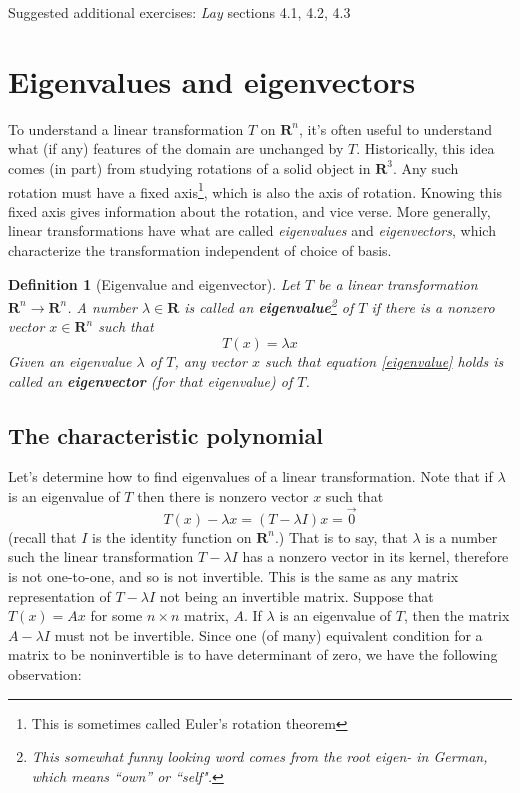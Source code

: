 \documentclass[12pt]{article}
\numberwithin{equation}{subsection}
\numberwithin{figure}{subsection}
\newtheorem{defn}[subsection]{Definition}
\theoremstyle{note}
\newcommand{\R}{\mathbf{R}}
\begin{document}
Suggested additional exercises: \textit{Lay} sections 4.1, 4.2, 4.3



\section{Eigenvalues and eigenvectors}

To understand a linear transformation $T$ on $\mathbf{R}^n$, it's often useful to understand what (if any) features of the domain are unchanged by $T$. Historically, this idea comes (in part) from studying rotations of a solid object in $\R^3$. Any such rotation must have a fixed axis\footnote{This is sometimes called Euler's rotation theorem}, which is also the axis of rotation. Knowing this fixed axis gives information about the rotation, and vice verse. More generally, linear transformations have what are called \textit{eigenvalues} and \textit{eigenvectors}, which characterize the transformation independent of choice of basis.   %


\begin{defn}[Eigenvalue and eigenvector]Let $T$ be a linear transformation $\mathbf{R}^n\to\mathbf{R}^n$. A number $\lambda\in\mathbf{R}$ is called an \textbf{eigenvalue}\footnote{This somewhat funny looking word comes from the root \textit{eigen}- in German, which means ``own'' or ``self".} of $T$ if there is a nonzero vector $x\in\mathbf{R}^n$ such that \begin{equation} \label{eigenvalue} T(x)=\lambda x\end{equation}
Given an eigenvalue $\lambda$ of $T$, any vector $x$ such that equation \eqref{eigenvalue} holds is called an \textbf{eigenvector} (for that {eigenvalue}) of $T$. 
\end{defn}


\subsection{The characteristic polynomial} 
Let's determine how to find eigenvalues of a linear transformation. Note that if $\lambda$ is an eigenvalue of $T$ then there is nonzero vector $x$ such that 
\begin{equation} T(x)-\lambda x=(T-\lambda I)x=\vec{0} \end{equation}
(recall that $I$ is the identity function on $\mathbf{R}^n$.) That is to say, that $\lambda$ is a number such the linear transformation $T-\lambda I$ has a nonzero vector in its kernel, therefore is not one-to-one, and so is not invertible. This is the same as any matrix representation of $T-\lambda I$ not being an invertible matrix. Suppose that $T(x)=Ax$ for some $n\times n$ matrix, $A$. If $\lambda$ is an eigenvalue of $T$, then the matrix $A-\lambda I$ must not be invertible. Since one (of many) equivalent condition for a matrix to be noninvertible is to have determinant of zero, we have the following observation: 
\end{document}
